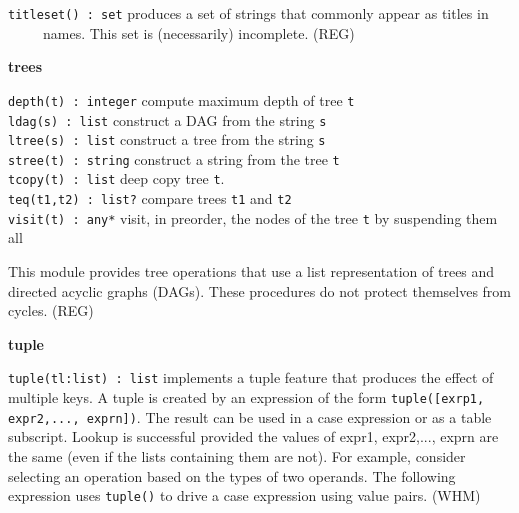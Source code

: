 \texttt{titleset() : set} produces a set of strings that commonly appear
as titles in\\
 \ \ \ \ \ names. This set is (necessarily) incomplete. (REG)

{\sffamily\bfseries
trees}

\texttt{depth(t) : integer} compute maximum depth of tree
\texttt{t}\\
\texttt{ldag(s) : list} construct a DAG from the string
\texttt{s}\\
\texttt{ltree(s) : list} construct a tree from the string
\texttt{s}\\
\texttt{stree(t) : string} construct a string from the tree
\texttt{t}\\
\texttt{tcopy(t) : list} deep copy tree \texttt{t}.\\
\texttt{teq(t1,t2) : list?} compare trees \texttt{t1} and
\texttt{t2}\\
\texttt{visit(t) : any*} visit, in preorder, the nodes of the tree
\texttt{t} by suspending them all 

This module provides tree operations that use a list representation of
trees and directed acyclic graphs (DAGs). These procedures do not
protect themselves from cycles. (REG)

{\sffamily\bfseries
tuple}

\texttt{tuple(tl:list) : list} implements a
{\textquotedbl}tuple{\textquotedbl} feature that produces the effect of
multiple keys. A tuple is created by an expression of the form
\texttt{tuple([exrp1, expr2,..., exprn])}. The result can be used in a
case expression or as a table subscript. Lookup
is successful provided the values of expr1, expr2,..., exprn are the
same (even if the lists containing them are not). For example, consider
selecting an operation based on the types of two operands. The
following expression uses \texttt{tuple()} to drive a case expression
using value pairs. (WHM)


